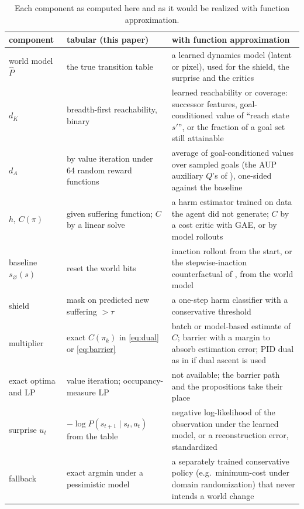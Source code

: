 \begin{table}[h]
\centering\footnotesize\setlength{\tabcolsep}{4pt}
\caption{Each component as computed here and as it would be realized with function approximation.}
\label{tab:scalable}
\begin{tabular}{p{2.6cm}p{5.6cm}p{7.3cm}}
\toprule
component & tabular (this paper) & with function approximation \\
\midrule
world model $\hat P$ & the true transition table & a learned dynamics model (latent or pixel), used for the shield, the surprise and the critics \\
\Karma{} $d_K$ & breadth-first reachability, binary & learned reachability or coverage: successor features, goal-conditioned value of ``reach state $s'$'', or the fraction of a goal set still attainable \cite{krakovna2020future} \\
\Anatta{} $d_A$ & \POWER{} by value iteration under 64 random reward functions & average of goal-conditioned values over sampled goals (the AUP auxiliary $Q$'s of \cite{turner2020aup}), one-sided against the baseline \\
\Metta{} $h$, $C(\pi)$ & given suffering function; $C$ by a linear solve & a harm estimator trained on data the agent did not generate; $C$ by a cost critic with GAE, or by model rollouts \\
baseline $s_\varnothing(s)$ & reset the world bits & inaction rollout from the start, or the stepwise-inaction counterfactual of \cite{krakovna2018rr}, from the world model \\
shield & mask on predicted new suffering $>\tau$ & a one-step harm classifier with a conservative threshold \cite{alshiekh2018shielding} \\
multiplier & exact $C(\pi_k)$ in \eqref{eq:dual} or \eqref{eq:barrier} & batch or model-based estimate of $C$; barrier with a margin to absorb estimation error; PID dual as in \cite{stooke2020pid} if dual ascent is used \\
exact optima and LP & value iteration; occupancy-measure LP & not available; the barrier path and the propositions take their place \\
surprise $u_t$ & $-\log\hat P(s_{t+1}\mid s_t,a_t)$ from the table & negative log-likelihood of the observation under the learned model, or a reconstruction error, standardized \\
fallback & exact argmin under a pessimistic model & a separately trained conservative policy (e.g.\ minimum-cost under domain randomization) that never intends a world change \\
\bottomrule
\end{tabular}
\end{table}

